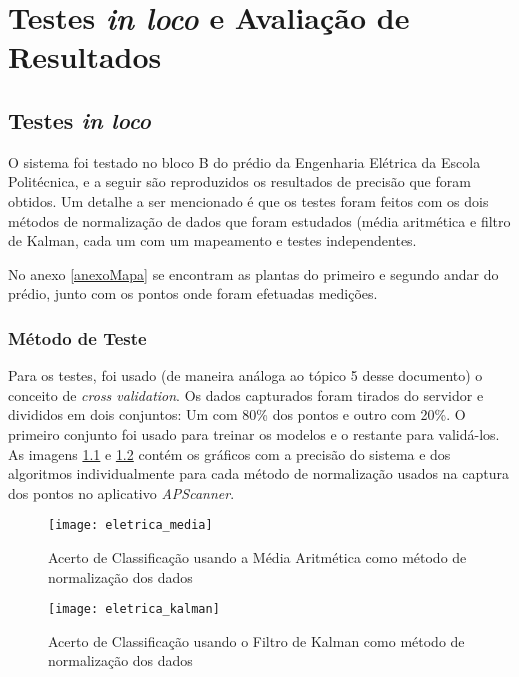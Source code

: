 \chapter{Testes \textit{in loco} e Avaliação de Resultados}

\section{Testes \textit{in loco}}
\label{testesinloco}

O sistema foi testado no bloco B do prédio da Engenharia Elétrica da Escola Politécnica, e a seguir são reproduzidos os resultados de precisão que foram obtidos. Um detalhe a ser mencionado é que os testes foram feitos com os dois métodos de normalização de dados que foram estudados (média aritmética e filtro de Kalman, cada um com um mapeamento e testes independentes.
\par
No anexo \ref{anexoMapa} se encontram as plantas do primeiro e segundo andar do prédio, junto com os pontos onde foram efetuadas medições.



\subsection{Método de Teste}

Para os testes, foi usado (de maneira análoga ao tópico 5 desse documento) o conceito de \textit{cross validation}. Os dados capturados foram tirados do servidor e divididos em dois conjuntos: Um com 80\% dos pontos e outro com 20\%. O primeiro conjunto foi usado para treinar os modelos e o restante para validá-los. As imagens \ref{fig:eletricaMedia} e \ref{fig:eletricaKalman} contém os gráficos com a precisão do sistema e dos algoritmos individualmente para cada método de normalização usados na captura dos pontos no aplicativo \textit{APScanner}.

\begin{figure}[H]

\centering
\caption{Acerto de Classificação usando a Média Aritmética como método de normalização dos dados}
\texttt{[image: eletrica\_media]}
\label{fig:eletricaMedia}

\end{figure}


\begin{figure}[H]

\centering
\caption{Acerto de Classificação usando o Filtro de Kalman como método de normalização dos dados}
\texttt{[image: eletrica\_kalman]}
\label{fig:eletricaKalman}

\end{figure}

